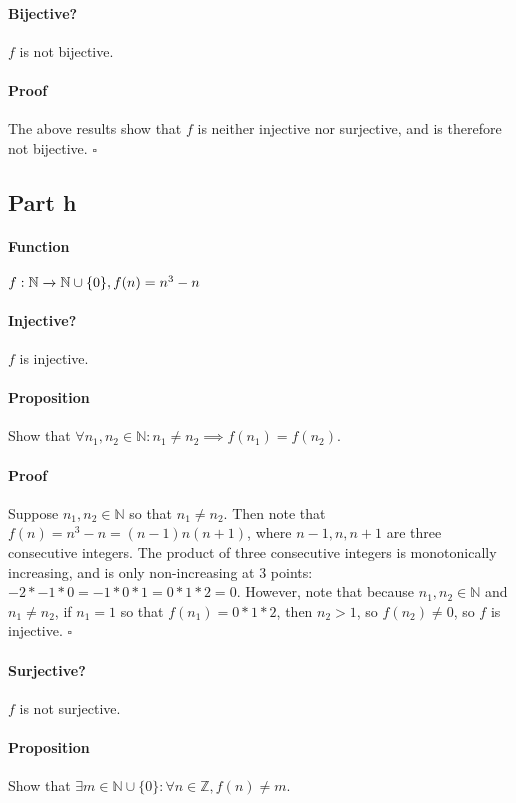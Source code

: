 \documentclass{article}
\begin{document}
{{\paragraph{Bijective?}
$f$ is not bijective.
\vspace{-10pt}
\paragraph{Proof}
The above results show that $f$ is neither injective nor surjective, and is therefore not bijective. $\square$
}
}
\subsection{Part h}
{
\paragraph{Function}$f:\mathbb{N}\xrightarrow{}{\mathbb{N}\cup\{0\}}, f(n)=n^3-n$
{
	\paragraph{Injective?}
	$f$ is injective.
	\vspace{-10pt}
	\paragraph{Proposition}
	Show that $\forall n_1, n_2 \in \mathbb{N}: n_1 \neq n_2 \implies f(n_1) = f(n_2)$.
	\vspace{-10pt}
	\paragraph{Proof}
	Suppose $n_1, n_2 \in \mathbb{N}$ so that $n_1 \neq n_2$. Then note that $f(n) = n^3-n = (n-1)n(n+1)$, where $n-1,n,n+1$ are three consecutive integers. The product of three consecutive integers is monotonically increasing, and is only non-increasing at 3 points: $-2*-1*0 = -1*0*1=0*1*2 = 0$. However, note that because $n_1, n_2 \in \mathbb{N}$ and $n_1 \neq n_2$, if $n_1 = 1$ so that $f(n_1) = 0*1*2$, then $n_2 > 1$, so $f(n_2) \neq 0$, so $f$ is injective. $\square$
}
{
	\paragraph{Surjective?}
	$f$ is not surjective.
	\vspace{-10pt}
	\paragraph{Proposition}
	Show that $\exists m \in \mathbb{N}\cup \{0\}: \forall n \in \mathbb{Z}, f(n) \neq m$.
	\vspace{-10pt}
}}
\end{document}
